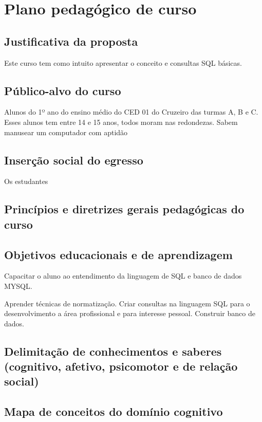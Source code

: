 \newpage
\chapter{Plano pedagógico de curso}

\section{Justificativa da proposta}

Este curso tem como intuito apresentar o conceito e consultas SQL básicas.

\section{Público-alvo do curso}

Alunos do 1º ano do ensino médio do CED 01 do Cruzeiro das turmas A, B e C. Esses alunos tem entre 14 e 15 anos, todos moram nas redondezas. Sabem manusear um computador com aptidão 

\section{Inserção social do egresso}

Os estudantes 

\section{Princípios e diretrizes gerais pedagógicas do curso}



\section{Objetivos educacionais e de aprendizagem}

Capacitar o aluno ao entendimento da linguagem de SQL e banco de dados MYSQL.

Aprender técnicas de normatização.
Criar consultas na linguagem SQL para o desenvolvimento a área profissional e para interesse pessoal.
Construir banco de dados.

\section{Delimitação de conhecimentos e saberes (cognitivo, afetivo, psicomotor e  de relação social)}



\section{Mapa de conceitos do domínio cognitivo}



